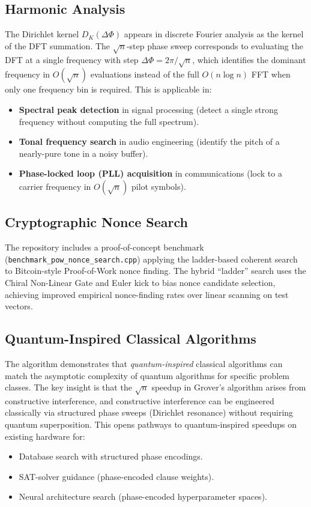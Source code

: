 \documentclass[12pt,a4paper]{article}
\theoremstyle{plain}
\theoremstyle{definition}
\theoremstyle{remark}
\begin{document}
\subsection{Harmonic Analysis}

The Dirichlet kernel $D_K(\Delta\Phi)$ appears in discrete Fourier analysis as
the kernel of the DFT summation.  The $\sqrt{n}$-step phase sweep corresponds
to evaluating the DFT at a single frequency with step $\Delta\Phi = 2\pi/\sqrt{n}$,
which identifies the dominant frequency in $O(\sqrt{n})$ evaluations instead
of the full $O(n\log n)$ FFT when only one frequency bin is required.
This is applicable in:
\begin{itemize}
  \item \textbf{Spectral peak detection} in signal processing (detect
    a single strong frequency without computing the full spectrum).
  \item \textbf{Tonal frequency search} in audio engineering
    (identify the pitch of a nearly-pure tone in a noisy buffer).
  \item \textbf{Phase-locked loop (PLL) acquisition} in communications
    (lock to a carrier frequency in $O(\sqrt{n})$ pilot symbols).
\end{itemize}

\subsection{Cryptographic Nonce Search}

The repository includes a proof-of-concept benchmark
(\texttt{benchmark\_pow\_nonce\_search.cpp}) applying the ladder-based
coherent search to Bitcoin-style Proof-of-Work nonce finding.  The hybrid
``ladder'' search uses the Chiral Non-Linear Gate and Euler kick to bias
nonce candidate selection, achieving improved empirical nonce-finding
rates over linear scanning on test vectors.

\subsection{Quantum-Inspired Classical Algorithms}

The algorithm demonstrates that \emph{quantum-inspired} classical algorithms
can match the asymptotic complexity of quantum algorithms for specific problem
classes.  The key insight is that the $\sqrt{n}$ speedup in Grover's algorithm
arises from constructive interference, and constructive interference can be
engineered classically via structured phase sweeps (Dirichlet resonance)
without requiring quantum superposition.  This opens pathways to
quantum-inspired speedups on existing hardware for:
\begin{itemize}
  \item Database search with structured phase encodings.
  \item SAT-solver guidance (phase-encoded clause weights).
  \item Neural architecture search (phase-encoded hyperparameter spaces).
\end{itemize}
\end{document}
